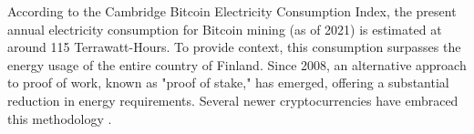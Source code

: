 According to the Cambridge Bitcoin Electricity Consumption Index, the present annual electricity consumption for Bitcoin mining (as of 2021) is estimated at around 115 Terrawatt-Hours. To provide context, this consumption surpasses the energy usage of the entire country of Finland. Since 2008, an alternative approach to proof of work, known as "proof of stake," has emerged, offering a substantial reduction in energy requirements. Several newer cryptocurrencies have embraced this methodology \cite{CBECS2021}.
